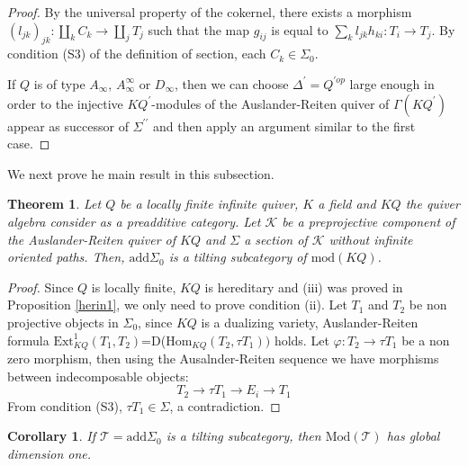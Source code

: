 \documentclass{amsart}
\newtheorem{theorem}{Theorem}
\theoremstyle{plain}
\newtheorem{corollary}{Corollary}
\numberwithin{equation}{section}
\begin{document}
\begin{proof}
By the universal property of the cokernel, there exists a morphism $(l_{jk})_{jk}:\coprod_{k}C_{k}\rightarrow \coprod_{j}T_{j}$ such that the
map $g_{ij}$ is equal to $\sum_{k}l_{jk}h_{ki}:T_{i}\rightarrow T_{j}$. By
condition (S3) of the definition of section, each $C_{k}\in \Sigma _{0}$.

If $Q$ is of type $A_{\infty }$, $A_{\infty }^{\infty }$ or $D_{\infty }$,
then we can choose $\Delta ^{\prime }=Q^{\prime op}$ large enough in order
to the injective $KQ^{\prime }$-modules of the Auslander-Reiten quiver of $\Gamma (KQ^{\prime })$ appear as successor of $\Sigma ^{\prime \prime }$ and
then apply an argument similar to the first case.
\end{proof}

We next prove he main result in this subsection.

\begin{theorem}
\label{tilthr} Let $Q$ be a locally finite infinite quiver, $K$ a field and $KQ$ the quiver algebra consider as a preadditive category. Let $\mathcal{K}$
be a preprojective component of the Auslander-Reiten quiver of $KQ$ and $\Sigma $ a section of $\mathcal{K}$ without infinite oriented paths. Then, $\mathrm{add}\Sigma _{0}$ is a tilting subcategory of $\mathrm{mod}(KQ)$.
\end{theorem}

\begin{proof}
Since $Q$ is locally finite, $KQ$ is hereditary and (iii) was proved in
Proposition \ref{herin1}, we only need to prove condition (ii). Let $T_{1}$
and $T_{2}$ be non projective objects in $\Sigma _{0}$, since $KQ$ is a
dualizing variety, Auslander-Reiten formula $\mathrm{Ext}_{KQ}^{1}(T_{1},T_{2})$=D($\mathrm{Hom}_{KQ}(T_{2},\tau T_{1}))$ holds. Let $\varphi :T_{2}\rightarrow \tau T_{1}$ be a non zero morphism, then using the
Ausalnder-Reiten sequence we have morphisms between indecomposable objects:\begin{equation*}
T_{2}\rightarrow \tau T_{1}\rightarrow E_{i}\rightarrow T_{1}
\end{equation*}From condition (S3), $\tau T_{1}\in \Sigma $, a contradiction.
\end{proof}

\begin{corollary}
\label{Sectilt} If $\mathcal{T}=\mathrm{add}\Sigma _{0}$ is a tilting
subcategory, then $\mathrm{\mathrm{Mod}}(\mathcal{T})$ has global dimension
one.
\end{corollary}
\end{document}
